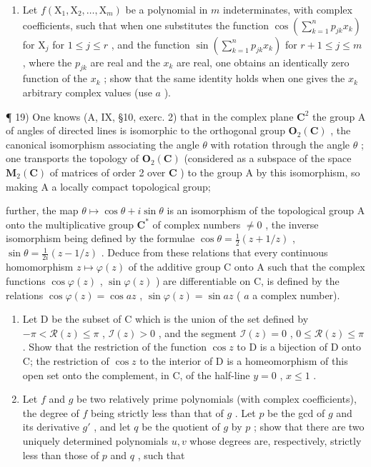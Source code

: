 \begin{enumerate}
\def\labelenumi{\alph{enumi})}
\setcounter{enumi}{1}
\tightlist
\item
  Let \(f(\mathrm{X}_1, \mathrm{X}_2, \ldots, \mathrm{X}_m)\) be a polynomial in \(m\) indeterminates, with complex coefficients, such that when one substitutes the function \(\cos\left(\sum_{k=1}^{n} p_{jk} x_k\right)\) for \(\mathrm{X}_j\) for \(1 \leqslant j \leqslant r\) , and the function \(\sin\left(\sum_{k=1}^{n} p_{jk} x_k\right)\) for \(r + 1 \leqslant j \leqslant m\) , where the \(p_{jk}\) are real and the \(x_k\) are real, one obtains an identically zero function of the \(x_k\) ; show that the same identity holds when one gives the \(x_k\) arbitrary complex values (use \(a\) ).
\end{enumerate}

¶ 19) One knows (A, IX, §10, exerc. 2) that in the complex plane \(\mathbf{C}^2\) the group A of angles of directed lines is isomorphic to the orthogonal group \(\mathbf{O}_2(\mathbf{C})\) , the canonical isomorphism associating the angle \(\theta\) with rotation through the angle \(\theta\) ; one transports the topology of \(\mathbf{O}_2(\mathbf{C})\) (considered as a subspace of the space \(\mathbf{M}_2(\mathbf{C})\) of matrices of order 2 over \(\mathbf{C}\) ) to the group A by this isomorphism, so making A a locally compact topological group;

further, the map \(\theta \mapsto \cos \theta + i\sin \theta\) is an isomorphism of the topological group A onto the multiplicative group \(\mathbf{C}^*\) of complex numbers \(\neq 0\) , the inverse isomorphism being defined by the formulae \(\cos \theta = \frac{1}{2}(z + 1 / z)\) , \(\sin \theta = \frac{1}{2i} (z - 1 / z)\) . Deduce from these relations that every continuous homomorphism \(z \mapsto \varphi(z)\) of the additive group C onto A such that the complex functions \(\cos \varphi(z)\) , \(\sin \varphi(z)\) ) are differentiable on C, is defined by the relations \(\cos \varphi(z) = \cos az\) , \(\sin \varphi(z) = \sin az\) ( \(a\) a complex number).

\begin{enumerate}
\def\labelenumi{\arabic{enumi})}
\setcounter{enumi}{19}
\item
  Let D be the subset of C which is the union of the set defined by \(-\pi < \mathcal{R}(z) \leqslant \pi\) , \(\mathcal{I}(z) > 0\) , and the segment \(\mathcal{I}(z) = 0\) , \(0 \leqslant \mathcal{R}(z) \leqslant \pi\) . Show that the restriction of the function \(\cos z\) to D is a bijection of D onto C; the restriction of \(\cos z\) to the interior of D is a homeomorphism of this open set onto the complement, in C, of the half-line \(y = 0\) , \(x \leqslant 1\) .
\item
  Let \(f\) and \(g\) be two relatively prime polynomials (with complex coefficients), the degree of \(f\) being strictly less than that of \(g\) . Let \(p\) be the gcd of \(g\) and its derivative \(g'\) , and let \(q\) be the quotient of \(g\) by \(p\) ; show that there are two uniquely determined polynomials \(u, v\) whose degrees are, respectively, strictly less than those of \(p\) and \(q\) , such that
\end{enumerate}

